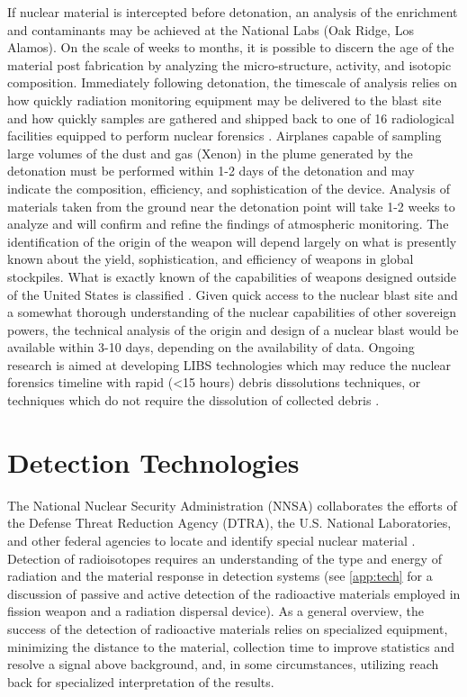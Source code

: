 \documentclass{report}
\begin{document}
If nuclear material is intercepted before detonation, an analysis of the enrichment and contaminants may be achieved at the National Labs (Oak Ridge, Los Alamos). On the scale of weeks to months, it is possible to discern the age of the material post fabrication by analyzing the micro-structure, activity, and isotopic composition. Immediately following detonation, the timescale of analysis relies on how quickly radiation monitoring equipment may be delivered to the blast site and how quickly samples are gathered and shipped back to one of 16 radiological facilities equipped to perform nuclear forensics \cite{1446400}. Airplanes capable of sampling large volumes of the dust and gas (Xenon) in the plume generated by the detonation must be performed within 1-2 days of the detonation and may indicate the composition, efficiency, and sophistication of the device. Analysis of materials taken from the ground near the detonation point will take 1-2 weeks to analyze and will confirm and refine the findings of atmospheric monitoring. The identification of the origin of the weapon will depend largely on what is presently known about the yield, sophistication, and efficiency of weapons in global stockpiles. What is exactly known of the capabilities of weapons designed outside of the United States is classified \cite{Glasstone_1964}. Given quick access to the nuclear blast site and a somewhat thorough understanding of the nuclear capabilities of other sovereign powers, the technical analysis of the origin and design of a nuclear blast would be available within 3-10 days, depending on the availability of data. Ongoing research is aimed at developing LIBS technologies which may reduce the nuclear forensics timeline with rapid (\textless 15 hours) debris dissolutions techniques, or techniques which do not require the dissolution of collected debris \cite{Condron}. 


\section{Detection Technologies}

The National Nuclear Security Administration (NNSA) collaborates the efforts of the Defense Threat Reduction Agency (DTRA), the U.S. National Laboratories, and other federal agencies to locate and identify special nuclear material \cite{NationalNuclearSecurityAdministration}. Detection of radioisotopes requires an understanding of the type and energy of radiation and the material response in detection systems (see \autoref{app:tech} for a discussion of passive and active detection of the radioactive materials employed in fission weapon and a radiation dispersal device). As a general overview, the success of the detection of radioactive materials relies on specialized equipment, minimizing the distance to the material, collection time to improve statistics and resolve a signal above background, and, in some circumstances, utilizing reach back for specialized interpretation of the results.
\end{document}

